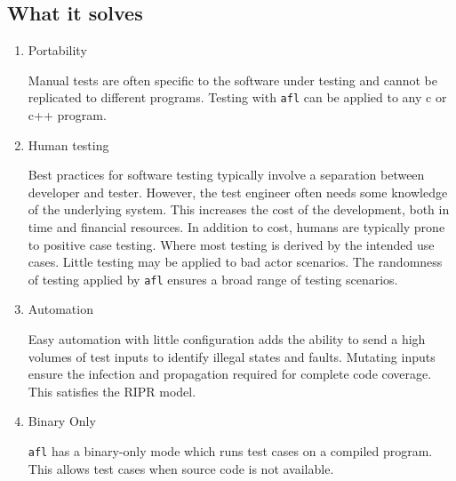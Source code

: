 \subsection {What it solves}

\begin{enumerate}

\item {Portability}

Manual tests are often specific to the software under testing and cannot be replicated to different programs. Testing with \texttt{afl} can be applied to any c or c++ program. 

\item {Human testing}

Best practices for software testing typically involve a separation between developer and tester. However, the test engineer often needs some knowledge of the underlying system. This increases the cost of the development, both in time and financial resources. In addition to cost, humans are typically prone to positive case testing. Where most testing is derived by the intended use cases. Little testing may be applied to bad actor scenarios. The randomness of testing applied by \texttt{afl} ensures a broad range of testing scenarios. 

\item{Automation}

Easy automation with little configuration adds the ability to send a high volumes of test inputs to identify illegal states and faults. Mutating inputs ensure the infection and propagation required for complete code coverage. This satisfies the RIPR model. 

\item {Binary Only}

\texttt{afl} has a binary-only mode which runs test cases on a compiled program. This allows test cases when source code is not available. 

\end{enumerate}


